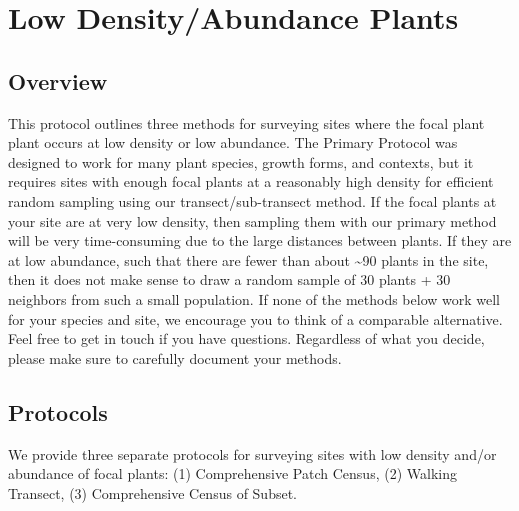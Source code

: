 \documentclass[
  letterpaper,
  oneside,
  open=any]{scrbook}
\begin{document}
\begin{figure}
\begin{minipage}{0.50\linewidth}
{}


\end{minipage}%

\end{figure}%

\chapter{Low Density/Abundance Plants}\label{sec-low_density}

\section{Overview}\label{overview-1}

This protocol outlines three methods for surveying sites where the focal
plant plant occurs at low density or low abundance. The Primary Protocol
was designed to work for many plant species, growth forms, and contexts,
but it requires sites with enough focal plants at a reasonably high
density for efficient random sampling using our transect/sub-transect
method. If the focal plants at your site are at very low density, then
sampling them with our primary method will be very time-consuming due to
the large distances between plants. If they are at low abundance, such
that there are fewer than about \textasciitilde90 plants in the site,
then it does not make sense to draw a random sample of 30 plants + 30
neighbors from such a small population. If none of the methods below
work well for your species and site, we encourage you to think of a
comparable alternative. Feel free to get in touch if you have questions.
Regardless of what you decide, please make sure to carefully document
your methods.

\section{Protocols}\label{protocols}

We provide three separate protocols for surveying sites with low density
and/or abundance of focal plants: (1) Comprehensive Patch Census, (2)
Walking Transect, (3) Comprehensive Census of Subset.
\end{document}
